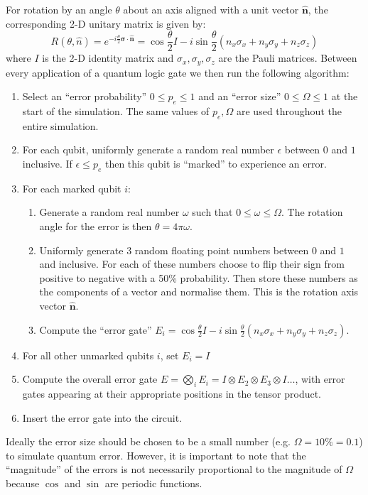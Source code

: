 \documentclass{article}[11pt]
\begin{document}
For rotation by an angle $\theta$ about an axis aligned with a unit vector $\mathbf{\hat n}$, the corresponding 2-D unitary matrix is given by:\cite{nielsenChuang,chenGroup}
\begin{equation}
R(\theta,\hat n)=e^{-i\frac{\theta}{2}\mathbf\sigma\cdot\mathbf{\hat n}}=\cos\frac{\theta}{2}I-i\sin\frac{\theta}{2}\left(n_x\sigma_x+n_y\sigma_y+n_z\sigma_z\right)
\end{equation}
where $I$ is the 2-D identity matrix and $\sigma_x,\sigma_y,\sigma_z$ are the Pauli matrices. Between every application of a quantum logic gate we then run the following algorithm:
\begin{enumerate}
    \item Select an ``error probability'' $0\leq p_e\leq1$ and an ``error size'' $0\leq\Omega\leq1$ at the start of the simulation. The same values of $p_e,\Omega$ are used throughout the entire simulation.
    \item For each qubit, uniformly generate a random real number $\epsilon$ between $0$ and $1$ inclusive. If $\epsilon\leq p_e$ then this qubit is ``marked'' to experience an error.
    \item For each marked qubit $i$:
    \begin{enumerate}
        \item Generate a random real number $\omega$ such that $0\leq\omega\leq\Omega$. The rotation angle for the error is then $\theta=4\pi\omega$.
        \item Uniformly generate 3 random floating point numbers between $0$ and $1$ and inclusive. For each of these numbers choose to flip their sign from positive to negative with a 50\% probability. Then store these numbers as the components of a vector and normalise them. This is the rotation axis vector $\mathbf{\hat n}$.
        \item Compute the ``error gate'' $E_i=\cos\frac{\theta}{2}I-i\sin\frac{\theta}{2}\left(n_x\sigma_x+n_y\sigma_y+n_z\sigma_z\right)$.
    \end{enumerate}
    \item For all other unmarked qubits $i$, set $E_i=I$
    \item Compute the overall error gate $E=\bigotimes_{i}E_i=I\otimes E_2\otimes E_3\otimes I\dots$, with error gates appearing at their appropriate positions in the tensor product.
    \item Insert the error gate into the circuit.
\end{enumerate}
Ideally the error size should be chosen to be a small number (e.g. $\Omega=10\%=0.1$) to simulate quantum error. However, it is important to note that the ``magnitude'' of the errors is not necessarily proportional to the magnitude of $\Omega$ because $\cos$ and $\sin$ are periodic functions.
\end{document}
